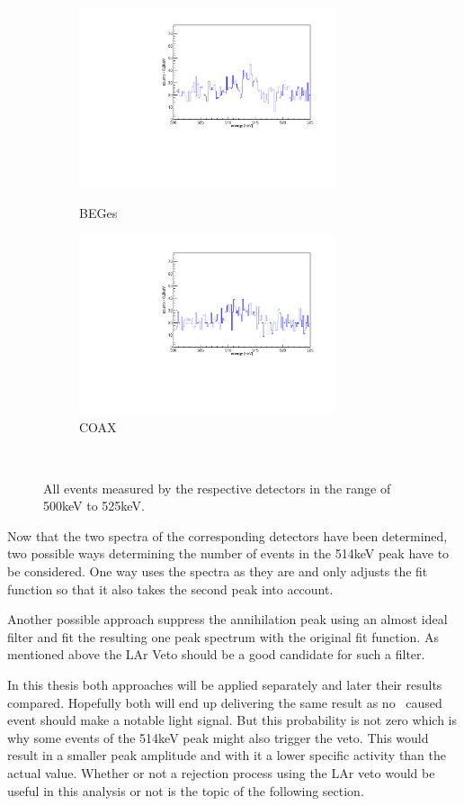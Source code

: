 \documentclass[encoding=utf8,british]{tumphthesis}
\begin{document}
\begin{figure}[t!]
\centering
\begin{subfigure}{.5\textwidth}
  \centering
	\includegraphics[width=75mm]{./Bilder/500525NoFilterBEGes.pdf}
  \label{fig:NoFilterBEGes}
  \caption{BEGes}
\end{subfigure}\hfill%
\begin{subfigure}{.5\textwidth}
  \centering
	\includegraphics[width=75mm]{./Bilder/500525NoFilterCOAX.pdf}
  \caption{COAX}
  \label{fig:NoFilterCOAX}
\end{subfigure}
    \\
	\vspace{0.5cm}
	\caption{All events measured by the respective detectors in the range of 500keV to 525keV.}
\end{figure}

Now that the two spectra of the corresponding detectors have been determined, two possible ways determining the number of events in the 514keV peak have to be considered.
One way uses the spectra as they are and only adjusts the fit function so that it also takes the second peak into account.

Another possible approach suppress the annihilation peak using an almost ideal filter and fit the resulting one peak spectrum with the original fit function.
As mentioned above the LAr Veto should be a good candidate for such a filter.

In this thesis both approaches will be applied separately and later their results compared.
Hopefully both will end up delivering the same result as no \Kr\ caused event should make a notable light signal.
But this probability is not zero which is why some events of the 514keV peak might also trigger the veto.
This would result in a smaller peak amplitude and with it a lower specific activity than the actual value. 
Whether or not a rejection process using the LAr veto would be useful in this analysis or not is the topic of the following section.
\\
\end{document}
